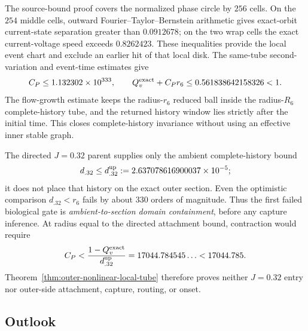 The source-bound proof covers the normalized phase circle by \(256\) cells.
On the \(254\) middle cells, outward Fourier--Taylor--Bernstein arithmetic
gives exact-orbit current-state separation greater than \(0.0912678\); on
the two wrap cells the exact current-voltage speed exceeds \(0.8262423\).
These inequalities provide the local event chart and exclude an earlier hit
of that local disk.  The same-tube second-variation and event-time estimates
give
\[
 C_P\le1.132302\times10^{333},
 \qquad
 Q_v^{\rm exact}+C_Pr_6
 \le0.561838642158326<1.
\]
The flow-growth estimate keeps the radius-\(r_6\) reduced ball inside the
radius-\(R_6\) complete-history tube, and the returned history window lies
strictly after the initial time.  This closes complete-history invariance
without using an effective inner stable graph.

The directed \(J=0.32\) parent supplies only the ambient complete-history
bound
\[
 d_{.32}\le d_{.32}^{\rm up}
 :=2.637078616900037\times10^{-5};
\]
it does not place that history on the exact outer section.  Even the
optimistic comparison \(d_{.32}<r_6\) fails by about \(330\) orders of
magnitude.  Thus the first failed biological gate is
\emph{ambient-to-section domain containment}, before any capture inference.
At radius equal to the directed attachment bound, contraction would require
\begin{equation}
 C_P<\frac{1-Q_v^{\rm exact}}{d_{.32}^{\rm up}}
 =17044.784545\ldots<17044.785.                       \label{eq:stage6b-cp-target}
\end{equation}
Theorem~\ref{thm:outer-nonlinear-local-tube} therefore proves neither
\(J=0.32\) entry nor outer-side attachment, capture, routing, or onset.

\subsection{Outlook}

